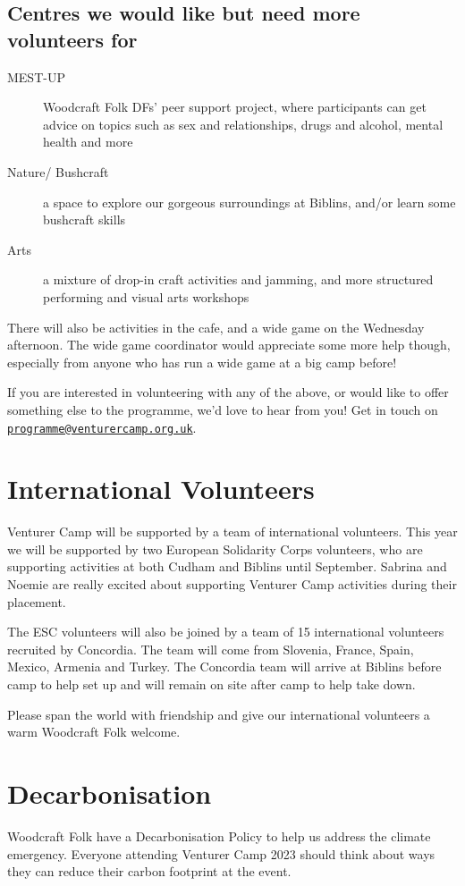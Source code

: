 \documentclass[a4paper, 11pt]{report}
\newcommand{\nl}{\newline}
\begin{document}
\section{Centres we would like but need more volunteers for}
\begin{description}
    \item[MEST-UP] Woodcraft Folk DFs' peer support project, where participants can get advice on topics such as sex and relationships, drugs and alcohol, mental health and more
    \item[Nature/ Bushcraft] a space to explore our gorgeous surroundings at Biblins, and/or learn some bushcraft skills
    \item[Arts]  a mixture of drop-in craft activities and jamming, and more structured performing and visual arts workshops 
\end{description}

There will also be activities in the cafe, and a wide game on the Wednesday afternoon. The wide game coordinator would appreciate some more help though, especially from anyone who has run a wide game at a big camp before! 

If you are interested in volunteering with any of the above, or would like to offer something else to the programme, we'd love to hear from you! Get in touch on 
\href{mailto:programme@venturercamp.org.uk}{\texttt{programme@venturercamp.org.uk}}.

\chapter{International Volunteers}
Venturer Camp will be supported by a team of international volunteers. This year we will be supported by two European Solidarity Corps volunteers, who are supporting activities at both Cudham and Biblins until September. Sabrina and Noemie are really excited about supporting Venturer Camp activities during their placement.\nl

The ESC volunteers will also be joined by a team of 15 international volunteers recruited by Concordia. The team will come from Slovenia, France, Spain, Mexico, Armenia and Turkey. The Concordia team will arrive at Biblins before camp to help set up and will remain on site after camp to help take down.\nl

Please span the world with friendship and give our international volunteers a warm Woodcraft Folk welcome.

\chapter{Decarbonisation}
Woodcraft Folk have a Decarbonisation Policy to help us address the climate emergency. Everyone attending Venturer Camp 2023 should think about ways they can reduce their carbon footprint at the event. 
\end{document}
